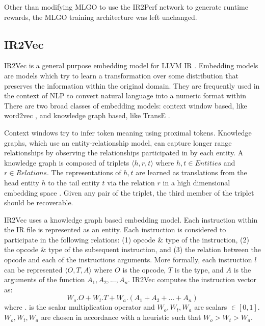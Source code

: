 \documentclass[nohyperref]{article}
\theoremstyle{plain}
\theoremstyle{definition}
\theoremstyle{remark}
\begin{document}
Other than modifying MLGO to use the IR2Perf network to generate runtime rewards, the MLGO training architecture was left unchanged.


\subsection{IR2Vec}
IR2Vec is a general purpose embedding model for LLVM IR \cite{ir2vec}. Embedding models are models which try to learn a transformation over some distribution that preserves the information within the original domain. They are frequently used in the context of NLP to convert natural language into a numeric format within There are two broad classes of embedding models: context window based, like word2vec \cite{word2vec}, and knowledge graph based, like TransE \cite{transE}. 

Context windows try to infer token meaning using proximal tokens. Knowledge graphs, which use an entity-relationship model, can capture longer range relationships by observing the relationships participated in by each entity. A knowledge graph is composed of triplets $\langle h, r, t \rangle$ where $h, t \in Entities$ and $r \in Relations$. The representations of $h, t$ are learned as translations from the head entity $h$ to the tail entity $t$ via the relation $r$ in a high dimensional embedding space \cite{ir2vec}. Given any pair of the triplet, the third member of the triplet should be recoverable.


IR2Vec uses a knowledge graph based embedding model. Each instruction within the IR file is represented as an entity. Each instruction is considered to participate in the following relations: (1) opcode \& type of the instruction, (2) the opcode \& type of the subsequent instruction, and (3) the relation between the opcode and each of the instructions arguments. More formally, each instruction $l$ can be represented $\langle O, T, A \rangle$ where $O$ is the opcode, $T$ is the type, and $A$ is the arguments of the function $A_1, A_2, ..., A_n$. IR2Vec computes the instruction vector as:
\begin{equation}\label{eq:ir2vec-inst-vec}
    W_o.O + W_t.T + W_a.(A_1 + A_2 + ... + A_n)
\end{equation}
where $.$ is the scalar multiplication operator and $W_o, W_t, W_a$ are scalars $\in [0, 1]$. $W_o, W_t, W_a$ are chosen in accordance with a heuristic such that $W_o > W_t > W_a$.
\end{document}

